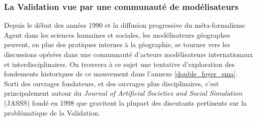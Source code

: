 



\subsubsection{La Validation vue par une communauté de modélisateurs}
\label{sssec:validation_modelisateurs}

Depuis le début des années 1990 et la diffusion progressive du méta-formalisme Agent \autocite{Treuil2008} dans les sciences humaines et sociales, les modélisateurs géographes peuvent, en plus des pratiques internes à la géographie, se tourner vers les discussions opérées dans une communauté d'acteurs modélisateurs internationaux et interdisciplinaires. On trouvera à ce sujet une tentative d'exploration des fondements historiques de ce mouvement dans l'annexe \ref{double_foyer_sma}. Sorti des ouvrages fondateurs, et des ouvrages plus disciplinaires, c'est principalement autour du \textit{Journal of Artificial Societies and Social Simulation} (JASSS) fondé en 1998 que gravitent la plupart des discutants pertinents sur la problématique de la Validation.

